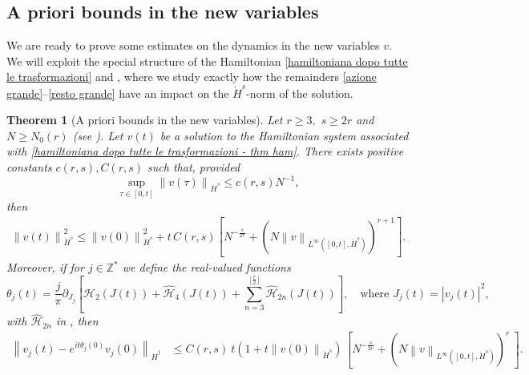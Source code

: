 \documentclass[a4paper,10pt,reqno]{article}
\theoremstyle{definition}
\theoremstyle{plain}
\newtheorem{theorem}[definition]{Theorem}
\theoremstyle{plain}
\theoremstyle{definition}
\theoremstyle{plain}
\theoremstyle{plain}
\theoremstyle{plain}
\theoremstyle{definition}
\theoremstyle{definition}
\newcommand{\norm}[1]{\left\lVert #1 \right\rVert}
\def \Z{\mathbb Z}
\def \H{\mathcal{H}}
\begin{document}
\subsection{A priori bounds in the new variables}
We are ready to prove some estimates on the dynamics in the new variables $v$.
We will exploit the special structure of the Hamiltonian \eqref{hamiltoniana dopo tutte le trasformazioni} and , where we study exactly how the remainders \ref{azione grande}--\ref{resto grande} have an impact on the $\dot{H}^s$-norm of the solution.

\begin{theorem}[A priori bounds in the new variables] \label{thm: dynamics in the new variables}
Let $r \ge 3,$ $s \ge 2r$ and $N \ge N_0(r)$ (see ).
Let $v(t)$ be a solution to the Hamiltonian system associated with \eqref{hamiltoniana dopo tutte le trasformazioni - thm ham}.
There exists positive constants $c(r,s), C(r,s)$ such that, provided
\begin{equation}
\sup_{\tau \in [0,t]} \norm{v(\tau)}_{\dot{H}^s} \le c(r,s) N^{-1},
\label{eq: hp dynam new var}
\end{equation}
then
\begin{equation}
\begin{split}
\norm{v(t)}_{\dot{H}^s}^2 \le \norm{v(0)}_{\dot{H}^s}^2 + t \, C(r,s) \left [ N^{-\frac{s}{2r}} + \left ( N \norm{v}_{L^{\infty}([0,t],\dot{H}^s)} \right )^{r+1}  \right ]. 
\end{split}
\label{eq: controllo norma sobolev}
\end{equation}
Moreover, if for $j \in \Z^*$ we define the real-valued functions
\begin{equation}
\theta_j(t) = \frac{j}{\pi} \partial_{J_j} \left [ \H_2(J(t)) + \widehat{\H}_4(J(t)) + \sum_{n=3}^{\lfloor \frac{r}{2} \rfloor} \widehat{\H}_{2n}(J(t)) \right], \quad \text{where $J_j(t) = |v_j(t)|^2,$}
\label{def: phases 2}
\end{equation}
with $\widehat{\mathcal{H}}_{2n}$ in , then 
\begin{equation}
\begin{split}
\norm{v_j(t)-e^{i t \theta_j(0)}v_j(0)}_{\dot{H}^1} & \le C(r,s)\ t \left ( 1 + t \norm{v(0)}_{\dot{H}^s} \right ) \, \left [ N^{-\frac{s}{2r}} + \left ( N \norm{v}_{L^{\infty}([0,t],\dot{H}^s)} \right )^r\ \right ].
\end{split}
\label{eq: controllo dinamica nuove variabili}
\end{equation}
\end{theorem}
\end{document}

